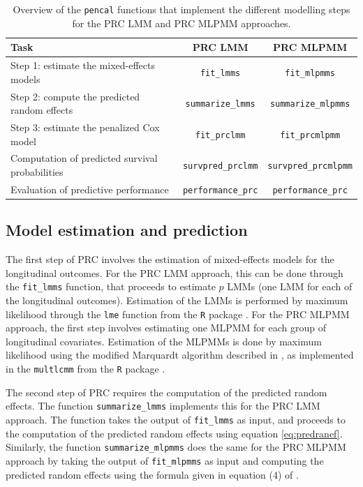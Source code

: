 \begin{table}
\caption{Overview of the \texttt{pencal} functions that implement the different modelling steps for the PRC LMM and PRC MLPMM approaches. \label{tab:functions}}
\centering
\begin{tabular}{l|c|c}
Task & PRC LMM & PRC MLPMM\\
\hline
Step 1: estimate the mixed-effects models & \texttt{fit\_lmms} & \texttt{fit\_mlpmms} \\ 
Step 2: compute the predicted random effects & \texttt{summarize\_lmms} & \texttt{summarize\_mlpmms} \\ 
Step 3: estimate the penalized Cox model & \texttt{fit\_prclmm} & \texttt{fit\_prcmlpmm} \\
Computation of predicted survival probabilities & \texttt{survpred\_prclmm} & \texttt{survpred\_prcmlpmm} \\
Evaluation of predictive performance & \texttt{performance\_prc} & \texttt{performance\_prc}\\
\end{tabular}
\end{table}

\subsection{Model estimation and
prediction}\label{model-estimation-and-prediction}

The first step of PRC involves the estimation of mixed-effects models
for the longitudinal outcomes. For the PRC LMM approach, this can be
done through the \texttt{fit\_lmms} function, that proceeds to estimate
\(p\) LMMs (one LMM for each of the longitudinal outcomes). Estimation
of the LMMs is performed by maximum likelihood through the \texttt{lme}
function from the \texttt{R} package 
\citep{pinheiro2000}. For the PRC MLPMM approach, the first step
involves estimating one MLPMM for each group of longitudinal covariates.
Estimation of the MLPMMs is done by maximum likelihood using the
modified Marquardt algorithm described in \citet{proust2013}, as
implemented in the \texttt{multlcmm} from the \texttt{R} package
 \citep{proust2017}.

The second step of PRC requires the computation of the predicted random
effects. The function \texttt{summarize\_lmms} implements this for the
PRC LMM approach. The function takes the output of \texttt{fit\_lmms} as
input, and proceeds to the computation of the predicted random effects
using equation \eqref{eq:predranef}. Similarly, the function
\texttt{summarize\_mlpmms} does the same for the PRC MLPMM approach by
taking the output of \texttt{fit\_mlpmms} as input and computing the
predicted random effects using the formula given in equation (4) of
\citet{signorelli2021}.

